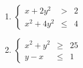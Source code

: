 \begin{multicols}{2}
\begin{enumerate}
\setcounter{enumi}{\value{HW}}

\item $\left\{\begin{array}{rcr}  x + 2y^{2} & > & 2 \\ x^{2} + 4y^{2} & \leq & 4  \end{array} \right.$
\item $\left\{\begin{array}{rcr}  x^{2} + y^{2} & \geq & 25 \\ y - x & \leq & 1  \end{array} \right.$ \label{nonlinearsysineqlast}

\setcounter{HW}{\value{enumi}}
\end{enumerate}
\end{multicols}

